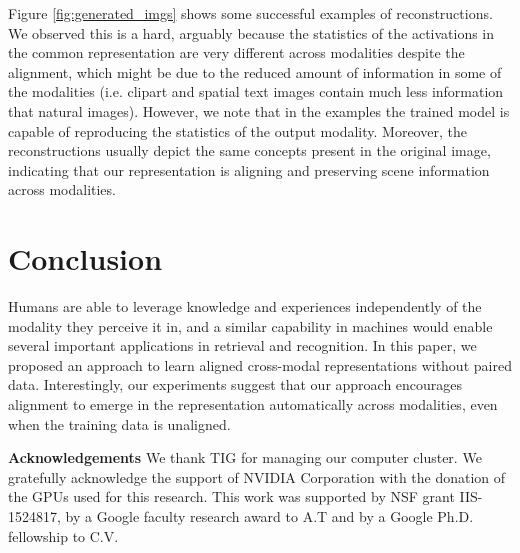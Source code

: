 \documentclass[10pt,journal,compsoc]{IEEEtran}
\begin{document}
    
    Figure \ref{fig:generated_imgs} shows some successful examples of reconstructions. We observed this is a hard, arguably because the statistics of the activations in the common representation are very different across modalities despite the alignment, which might be due to the reduced amount of information in some of the modalities (i.e. clipart and spatial text images contain much less information that natural images). However, we note that in the examples the trained model is capable of reproducing the statistics of the output modality. Moreover, the reconstructions usually depict the same concepts present in the original image, indicating that our representation is aligning and preserving scene information across modalities.
	

	
\section{Conclusion}

Humans are able to leverage knowledge and experiences independently of the modality they perceive it in, and a similar capability in machines would enable several important applications in retrieval and recognition. In this paper, we proposed an approach to learn aligned cross-modal representations without paired data. Interestingly, our experiments suggest that our approach encourages alignment to emerge in the representation automatically across modalities, even when the training data is unaligned. 

\textbf{Acknowledgements} We thank TIG for managing our computer cluster. We gratefully acknowledge the support of NVIDIA Corporation with the donation of the GPUs used for this research. This work was supported by NSF grant IIS-1524817, by a Google faculty research award to A.T and by a Google Ph.D. fellowship to C.V.





{


}

\vfill\eject
\end{document}
